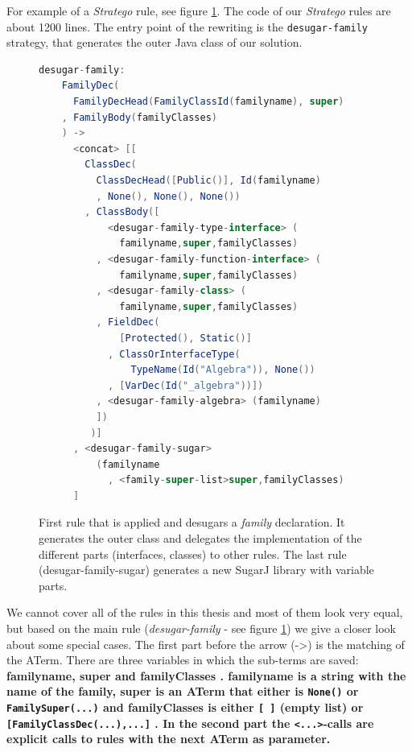 \documentclass{report}
\begin{document}
For example of a \emph{Stratego} rule, see figure \ref{exampleStrategoClassInterfaceTranslation}. The code of our \emph{Stratego} rules are about 1200 lines. The entry point of the rewriting is the \lstinline{desugar-family} strategy, that generates the outer Java class of our solution.

\begin{figure}[H]
\begin{lstlisting}[language=java,breaklines=false,morekeywords={familyname,super,familyClasses},keywordstyle=\bfseries\color{OliveGreen}]
  desugar-family:
    FamilyDec(
      FamilyDecHead(FamilyClassId(familyname), super)
    , FamilyBody(familyClasses)
    ) ->
      <concat> [[
        ClassDec(
          ClassDecHead([Public()], Id(familyname)
          , None(), None(), None())
        , ClassBody([
            <desugar-family-type-interface> (
              familyname,super,familyClasses)
          , <desugar-family-function-interface> (
              familyname,super,familyClasses)
          , <desugar-family-class> (
              familyname,super,familyClasses)
          , FieldDec(
              [Protected(), Static()]
            , ClassOrInterfaceType(
                TypeName(Id("Algebra")), None())
            , [VarDec(Id("_algebra"))])
          , <desugar-family-algebra> (familyname)
          ])
	     )]
      , <desugar-family-sugar>
          (familyname
            , <family-super-list>super,familyClasses)
      ]
\end{lstlisting}
\caption{First rule that is applied and desugars a \emph{family} declaration. It generates the outer class and delegates the implementation of the different parts (interfaces, classes) to other rules. The last rule (desugar-family-sugar) generates a new SugarJ library with variable parts.}
\label{exampleStrategoClassInterfaceTranslation}
\end{figure}

We cannot cover all of the rules in this thesis and most of them look very equal, but based on the main rule (\emph{desugar-family} - see figure \ref{exampleStrategoClassInterfaceTranslation}) we give a closer look about some special cases. The first part before the arrow (->) is the matching of the ATerm. There are three variables in which the sub-terms are saved: \bfseries familyname\mdseries, \bfseries super \mdseries and \bfseries familyClasses \mdseries. \bfseries familyname \mdseries is a string with the name of the family, \bfseries super \mdseries is an ATerm that either is \lstinline{None()} or \lstinline{FamilySuper(...)} and \bfseries familyClasses \mdseries is either \lstinline{[ ]} (empty list) or \lstinline{[FamilyClassDec(...),...]} . In the second part the \lstinline{<...>}-calls are explicit calls to rules with the next ATerm as parameter.
\end{document}
